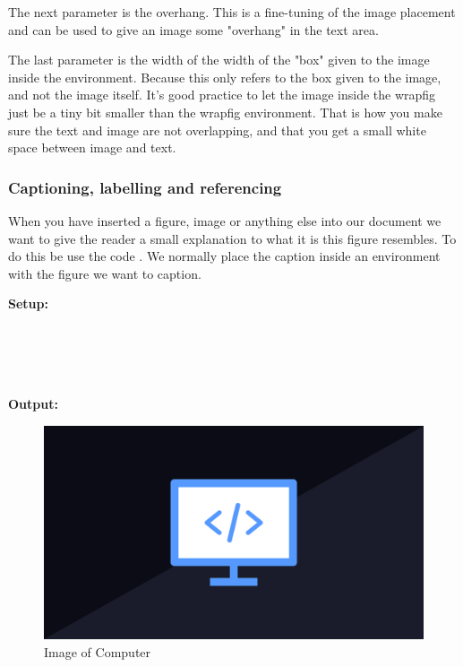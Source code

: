 The next parameter is the overhang. This is a fine-tuning of the image placement and can be used to give an image some "overhang" in the text area. 

The last parameter is the width of the width of the "box" given to the image inside the environment. Because this only refers to the box given to the image, and not the image itself.
It's good practice to let the image inside the wrapfig just be a tiny bit smaller than the wrapfig environment. That is how you make sure the text and image are not overlapping, and that you
get a small white space between image and text.

\subsubsection{Captioning, labelling and referencing}
When you have inserted a figure, image or anything else into our document we want to give the reader a small explanation to what
it is this figure resembles. To do this be use the code .
We normally place the caption inside an environment with the figure we want to caption. 

\begin{multicols}{2}
    \vspace{0.5em}
    \noindent
    \textbf{Setup:} \\
     \\
     \\
     \\
     \\
    \columnbreak

    \vspace{0.5em}
    \noindent
    \textbf{Output:}
    \begin{figure}[H]
        \includegraphics[scale=0.1]{Images/Programming.png}
        \caption{Image of Computer}
        \label{fig:image_of_computer_caption}
    \end{figure}
\end{multicols}


